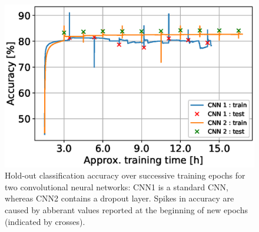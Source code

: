 \label{sec:results}
\begin{figure}[h!]
\centering
	\includegraphics[scale=0.6]{CNNaccuracy} 
        \caption{Hold-out classification accuracy over successive training epochs for two convolutional neural networks: CNN1 is a standard CNN, whereas CNN2 contains a dropout layer. Spikes in accuracy are caused by abberant values reported at the beginning of new epochs (indicated by crosses).}
\label{plot:CNNaccuracy}
\end{figure}
\FloatBarrier



